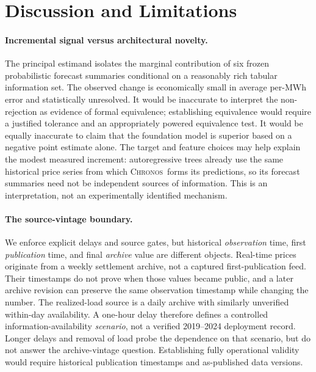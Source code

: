 \documentclass[11pt,letterpaper]{article}
\newcommand{\Chronos}{\textsc{Chronos}}
\begin{document}
\section{Discussion and Limitations}\label{sec:discussion}
\paragraph{Incremental signal versus architectural novelty.} The principal estimand isolates the marginal contribution of six frozen probabilistic forecast summaries conditional on a reasonably rich tabular information set. The observed change is economically small in average per-MWh error and statistically unresolved. It would be inaccurate to interpret the non-rejection as evidence of formal equivalence; establishing equivalence would require a justified tolerance and an appropriately powered equivalence test. It would be equally inaccurate to claim that the foundation model is superior based on a negative point estimate alone. The target and feature choices may help explain the modest measured increment: autoregressive trees already use the same historical price series from which \Chronos\ forms its predictions, so its forecast summaries need not be independent sources of information. This is an interpretation, not an experimentally identified mechanism.

\paragraph{The source-vintage boundary.} We enforce explicit delays and source gates, but historical \emph{observation} time, first \emph{publication} time, and final \emph{archive} value are different objects. Real-time prices originate from a weekly settlement archive, not a captured first-publication feed. Their timestamps do not prove when those values became public, and a later archive revision can preserve the same observation timestamp while changing the number. The realized-load source is a daily archive with similarly unverified within-day availability. A one-hour delay therefore defines a controlled information-availability \emph{scenario}, not a verified 2019--2024 deployment record. Longer delays and removal of load probe the dependence on that scenario, but do not answer the archive-vintage question. Establishing fully operational validity would require historical publication timestamps and as-published data versions.
\end{document}
